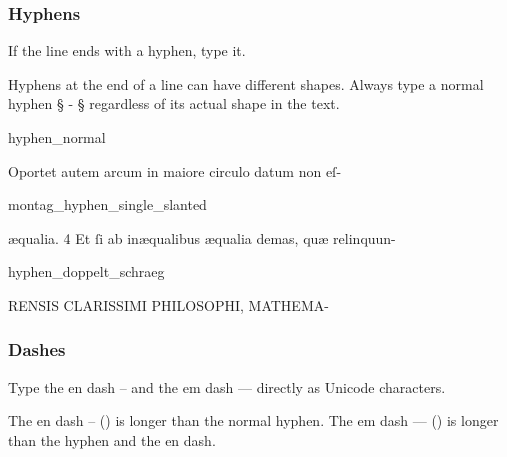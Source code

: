 \subsubsection{Hyphens}
\label{section hyphens}

\begin{mainrule}
If the line ends with a hyphen, type it.
\end{mainrule}

\begin{clarification}
Hyphens at the end of a line can have different shapes. Always type a normal hyphen § - § regardless of its actual shape in the text. %
\end{clarification}

\vspace{2mm}
\begin{sampleImage}{hyphen_normal}
\begin{typeLatin}
Oportet autem arcum in maiore circulo datum non eſ-
\end{typeLatin}
\end{sampleImage}

\begin{sampleImage}{montag_hyphen_single_slanted}
\begin{typeLatin}
æqualia. 4 Et ſi ab inæqualibus æqualia demas, quæ relinquun-
\end{typeLatin}
\end{sampleImage}

\begin{sampleImage}{hyphen_doppelt_schraeg}
\begin{typeLatin}
RENSIS CLARISSIMI PHILOSOPHI, MATHEMA-
\end{typeLatin}
\end{sampleImage}

\subsubsection{Dashes}
\label{section dashes}

\begin{mainrule}
Type the en dash – and the em dash — directly as Unicode characters.
\end{mainrule}

\begin{clarification}
The en dash – () is longer than the normal hyphen. The em dash — () is longer than the hyphen and the en dash.
\end{clarification}

